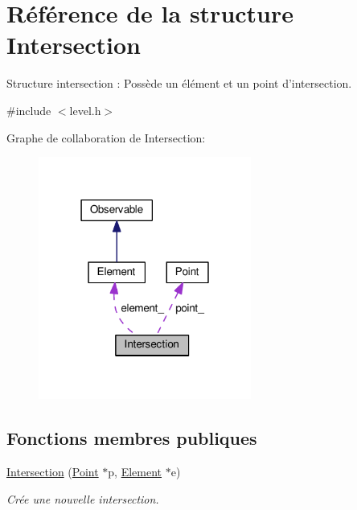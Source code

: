 \hypertarget{structIntersection}{\section{Référence de la structure Intersection}
\label{structIntersection}
}


Structure intersection \+: Possède un élément et un point d'intersection.  




{\ttfamily \#include $<$level.\+h$>$}



Graphe de collaboration de Intersection\+:\nopagebreak
\begin{figure}[H]
\begin{center}
\leavevmode
\includegraphics[width=198pt]{d9/d8e/structIntersection__coll__graph}
\end{center}
\end{figure}
\subsection*{Fonctions membres publiques}
\begin{DoxyCompactItemize}
\item 
\hyperlink{structIntersection_a44d7ebd733fe15894a44f14a63c3d328}{Intersection} (\hyperlink{classPoint}{Point} $\ast$p, \hyperlink{classElement}{Element} $\ast$e)
\begin{DoxyCompactList}\small\item\em Crée une nouvelle intersection. \end{DoxyCompactList}\end{DoxyCompactItemize}
